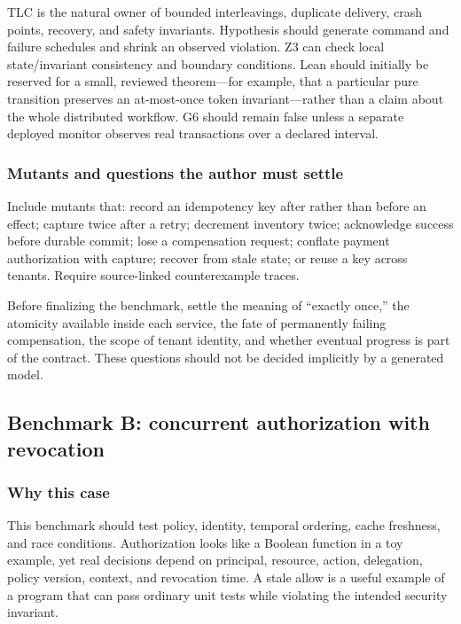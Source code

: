 \documentclass[11pt]{article}
\begin{document}
TLC is the natural owner of bounded interleavings, duplicate delivery, crash
points, recovery, and safety invariants.  Hypothesis should generate command
and failure schedules and shrink an observed violation.  Z3 can check local
state/invariant consistency and boundary conditions.  Lean should initially
be reserved for a small, reviewed theorem---for example, that a particular
pure transition preserves an at-most-once token invariant---rather than a
claim about the whole distributed workflow.  G6 should remain false unless a
separate deployed monitor observes real transactions over a declared interval.

\subsubsection*{Mutants and questions the author must settle}

Include mutants that: record an idempotency key after rather than before an
effect; capture twice after a retry; decrement inventory twice; acknowledge
success before durable commit; lose a compensation request; conflate payment
authorization with capture; recover from stale state; or reuse a key across
tenants.  Require source-linked counterexample traces.

Before finalizing the benchmark, settle the meaning of ``exactly once,'' the
atomicity available inside each service, the fate of permanently failing
compensation, the scope of tenant identity, and whether eventual progress is
part of the contract.  These questions should not be decided implicitly by a
generated model.

\subsection{Benchmark B: concurrent authorization with revocation}

\subsubsection*{Why this case}

This benchmark should test policy, identity, temporal ordering, cache
freshness, and race conditions.  Authorization looks like a Boolean function
in a toy example, yet real decisions depend on principal, resource, action,
delegation, policy version, context, and revocation time.  A stale allow is a
useful example of a program that can pass ordinary unit tests while violating
the intended security invariant.
\end{document}
